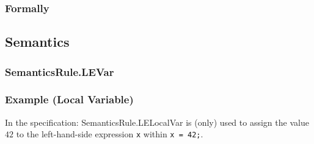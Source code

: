\subsubsection{Formally}
\begin{mathpar}
\end{mathpar}

\begin{mathpar}
\end{mathpar}

\begin{mathpar}
\end{mathpar}

\subsection{Semantics}
\subsubsection{SemanticsRule.LEVar\label{sec:SemanticsRule.LEVar}}
\subsubsection{Example (Local Variable)}
In the specification:
SemanticsRule.LELocalVar is (only) used to assign the value $42$ to the left-hand-side expression
\texttt{x} within \texttt{x = 42;}.

